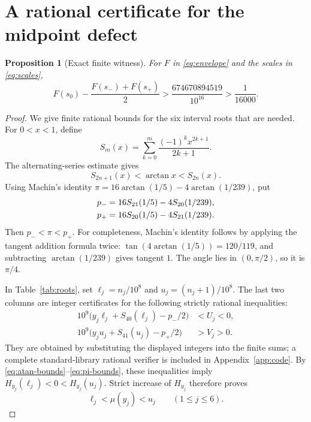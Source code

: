 \documentclass[11pt,a4paper]{article}
\newtheorem{proposition}[theorem]{Proposition}
\theoremstyle{definition}\newtheorem{definition}[theorem]{Definition}
\theoremstyle{remark}\newtheorem{remark}[theorem]{Remark}
\begin{document}
\section{A rational certificate for the midpoint defect}
\label{sec:certificate}

\begin{proposition}[Exact finite witness]\label{prop:gap}
For $F$ in \eqref{eq:envelope} and the scales in
\eqref{eq:scales},
\begin{equation}\label{eq:exact-gap}
 F(s_0)-\frac{F(s_-)+F(s_+)}2
 >\frac{674670894519}{10^{16}}>\frac1{16000}.
\end{equation}
\end{proposition}

\begin{proof}
We give finite rational bounds for the six interval roots that
are needed. For $0<x<1$, define
\[
 S_m(x)=\sum_{k=0}^m\frac{(-1)^k x^{2k+1}}{2k+1}.
\]
The alternating-series estimate gives
\begin{equation}\label{eq:atan-bounds}
 S_{2n+1}(x)<\arctan x<S_{2n}(x).
\end{equation}
Using Machin's identity
$\pi=16\arctan(1/5)-4\arctan(1/239)$, put
\begin{align}
 p_-&=16S_{21}(1/5)-4S_{20}(1/239),\notag\\
 p_+&=16S_{20}(1/5)-4S_{21}(1/239).
 \label{eq:pi-bounds}
\end{align}
Then $p_-<\pi<p_+$. For completeness, Machin's identity follows
by applying the tangent addition formula twice:
$\tan(4\arctan(1/5))=120/119$, and subtracting
$\arctan(1/239)$ gives tangent $1$. The angle lies in
$(0,\pi/2)$, so it is $\pi/4$.

In Table~\ref{tab:roots}, set $\ell_j=n_j/10^8$ and
$u_j=(n_j+1)/10^8$. The last two columns are integer certificates
for the following strictly rational inequalities:
\begin{align}
 10^9\bigl(y_j\ell_j+S_{40}(\ell_j)-p_-/2\bigr)&<U_j<0,
 \label{eq:cert-low}\\
 10^9\bigl(y_ju_j+S_{41}(u_j)-p_+/2\bigr)&>V_j>0.
 \label{eq:cert-high}
\end{align}
They are obtained by substituting the displayed integers into
the finite sums; a complete standard-library rational verifier
is included in Appendix~\ref{app:code}. By
\eqref{eq:atan-bounds}--\eqref{eq:pi-bounds}, these inequalities
imply $H_{y_j}(\ell_j)<0<H_{y_j}(u_j)$. Strict increase of
$H_{y_j}$ therefore proves
\begin{equation}\label{eq:root-brackets}
 \ell_j<\mu(y_j)<u_j\qquad(1\le j\le6).
\end{equation}


\end{proof}
\end{document}
